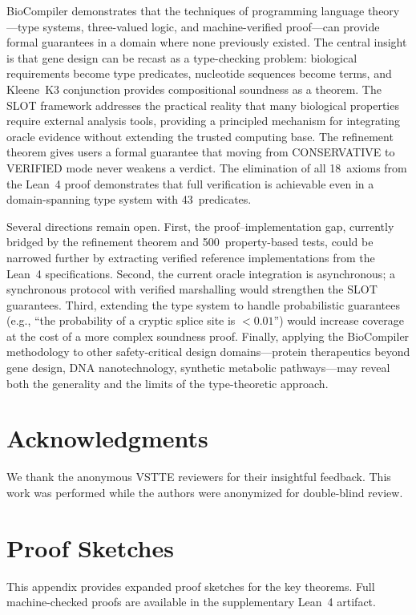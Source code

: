 \documentclass[acmsmall,review,anonymous]{acmart}
\begin{document}
BioCompiler demonstrates that the techniques of programming language
theory---type systems, three-valued logic, and machine-verified
proof---can provide formal guarantees in a domain where none previously
existed.
The central insight is that gene design can be recast as a
type-checking problem: biological requirements become type predicates,
nucleotide sequences become terms, and Kleene~K3 conjunction provides
compositional soundness as a theorem.
The SLOT framework addresses the practical reality that many biological
properties require external analysis tools, providing a principled
mechanism for integrating oracle evidence without extending the trusted
computing base.
The refinement theorem gives users a formal guarantee that moving from
CONSERVATIVE to VERIFIED mode never weakens a verdict.
The elimination of all 18~axioms from the Lean~4 proof demonstrates
that full verification is achievable even in a domain-spanning type
system with 43~predicates.

Several directions remain open.
First, the proof--implementation gap, currently bridged by the
refinement theorem and 500~property-based tests, could be narrowed
further by extracting verified reference implementations from the
Lean~4 specifications.
Second, the current oracle integration is asynchronous; a synchronous
protocol with verified marshalling would strengthen the SLOT guarantees.
Third, extending the type system to handle probabilistic guarantees
(e.g., ``the probability of a cryptic splice site is $< 0.01$'') would
increase coverage at the cost of a more complex soundness proof.
Finally, applying the BioCompiler methodology to other
safety-critical design domains---protein therapeutics beyond gene
design, DNA nanotechnology, synthetic metabolic pathways---may reveal
both the generality and the limits of the type-theoretic approach.

\section*{Acknowledgments}

We thank the anonymous VSTTE reviewers for their insightful feedback.
This work was performed while the authors were anonymized for
double-blind review.

\appendix
\section{Proof Sketches}\label{app:proofs}

This appendix provides expanded proof sketches for the key theorems.
Full machine-checked proofs are available in the supplementary
Lean~4 artifact.
\end{document}
